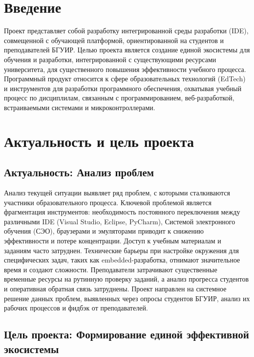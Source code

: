 \documentclass{bsuir}
\begin{document}
\maketitle

\mainmatter

\section{Введение}

Проект представляет собой разработку интегрированной среды разработки (IDE),
совмещенной с обучающей платформой, ориентированной на студентов и преподавателей
БГУИР. Целью проекта является создание единой экосистемы для обучения и разработки,
интегрированной с существующими ресурсами университета, для существенного повышения
эффективности учебного процесса. Программный продукт относится к сфере образовательных
технологий (EdTech) и инструментов для разработки программного обеспечения, охватывая
учебный процесс по дисциплилам, связанным с программированием, веб-разработкой,
встраиваемыми системами и микроконтроллерами.

\section{Актуальность и цель проекта}

\subsection{Актуальность: Анализ проблем}

Анализ текущей ситуации выявляет ряд проблем, с которыми сталкиваются участники
образовательного процесса. Ключевой проблемой является фрагментация инструментов:
необходимость постоянного переключения между различными IDE (Visual Studio, Eclipse,
PyCharm), Системой электронного обучения (СЭО), браузерами и эмуляторами приводит
к снижению эффективности и потере концентрации. Доступ к учебным материалам и
заданиям часто затруднен. Технические барьеры при настройке окружения для
специфических задач, таких как embedded-разработка, отнимают значительное время
и создают сложности. Преподаватели затрачивают существенные временные ресурсы
на рутинную проверку заданий, а анализ прогресса студентов и оперативная обратная
связь затруднены. Проект направлен на системное решение данных проблем, выявленных
через опросы студентов БГУИР, анализ их рабочих процессов и фидбэк от преподавателей.

\subsection{Цель проекта: Формирование единой эффективной экосистемы}
\end{document}
